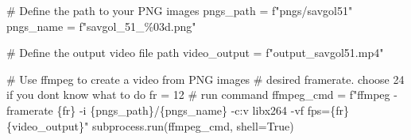 \documentclass[
  letterpaper,
  DIV=11,
  numbers=noendperiod,
  oneside]{scrreprt}
\newenvironment{Shaded}{\begin{snugshade}}{\end{snugshade}}
\newcommand{\CommentTok}[1]{\textcolor[rgb]{0.37,0.37,0.37}{#1}}
\newcommand{\DecValTok}[1]{\textcolor[rgb]{0.68,0.00,0.00}{#1}}
\newcommand{\NormalTok}[1]{\textcolor[rgb]{0.00,0.23,0.31}{#1}}
\newcommand{\OperatorTok}[1]{\textcolor[rgb]{0.37,0.37,0.37}{#1}}
\newcommand{\SpecialCharTok}[1]{\textcolor[rgb]{0.37,0.37,0.37}{#1}}
\newcommand{\SpecialStringTok}[1]{\textcolor[rgb]{0.13,0.47,0.30}{#1}}
\newcommand{\VariableTok}[1]{\textcolor[rgb]{0.07,0.07,0.07}{#1}}
\begin{document}
\begin{Shaded}
\begin{Highlighting}[]
\CommentTok{\# Define the path to your PNG images}
\NormalTok{pngs\_path }\OperatorTok{=} \SpecialStringTok{f"pngs/savgol51"}
\NormalTok{pngs\_name }\OperatorTok{=} \SpecialStringTok{f"savgol\_51\_\%03d.png"}

\CommentTok{\# Define the output video file path}
\NormalTok{video\_output }\OperatorTok{=} \SpecialStringTok{f"output\_savgol51.mp4"}

\CommentTok{\# Use ffmpeg to create a video from PNG images}
\CommentTok{\# desired framerate. choose 24 if you don\textquotesingle{}t know what to do}
\NormalTok{fr }\OperatorTok{=} \DecValTok{12}
\CommentTok{\# run command}
\NormalTok{ffmpeg\_cmd }\OperatorTok{=} \SpecialStringTok{f"ffmpeg {-}framerate }\SpecialCharTok{\{}\NormalTok{fr}\SpecialCharTok{\}}\SpecialStringTok{ {-}i }\SpecialCharTok{\{}\NormalTok{pngs\_path}\SpecialCharTok{\}}\SpecialStringTok{/}\SpecialCharTok{\{}\NormalTok{pngs\_name}\SpecialCharTok{\}}\SpecialStringTok{ {-}c:v libx264 {-}vf fps=}\SpecialCharTok{\{}\NormalTok{fr}\SpecialCharTok{\}}\SpecialStringTok{ }\SpecialCharTok{\{}\NormalTok{video\_output}\SpecialCharTok{\}}\SpecialStringTok{"}
\NormalTok{subprocess.run(ffmpeg\_cmd, shell}\OperatorTok{=}\VariableTok{True}\NormalTok{)}
\end{Highlighting}
\end{Shaded}
\end{document}
